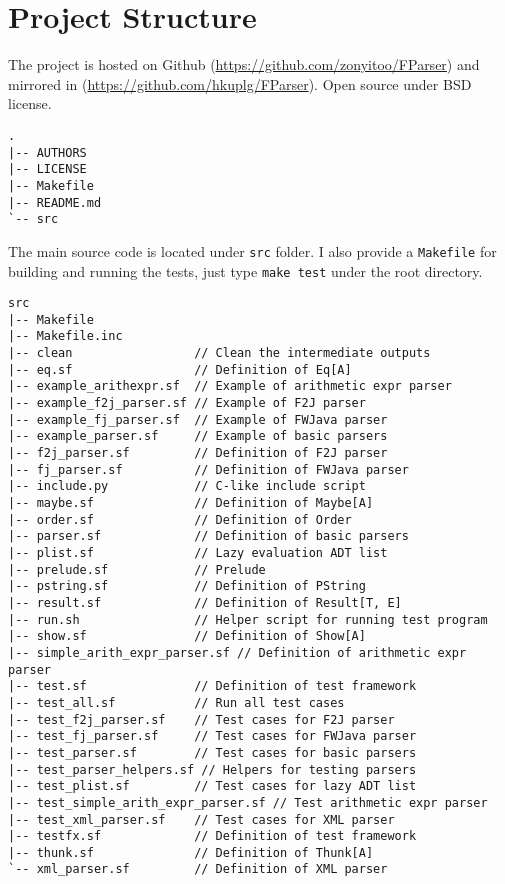 \section{Project Structure}

The project is hosted on Github (\url{https://github.com/zonyitoo/FParser}) and mirrored in (\url{https://github.com/hkuplg/FParser}). Open source under BSD license.

\begin{lstlisting}[language={}]
.
|-- AUTHORS
|-- LICENSE
|-- Makefile
|-- README.md
`-- src
\end{lstlisting}

The main source code is located under \texttt{src} folder. I also provide a \texttt{Makefile} for building and running the tests, just type \texttt{make test} under the root directory.

\begin{lstlisting}[language={}]
src
|-- Makefile
|-- Makefile.inc
|-- clean                 // Clean the intermediate outputs
|-- eq.sf                 // Definition of Eq[A]
|-- example_arithexpr.sf  // Example of arithmetic expr parser
|-- example_f2j_parser.sf // Example of F2J parser
|-- example_fj_parser.sf  // Example of FWJava parser
|-- example_parser.sf     // Example of basic parsers
|-- f2j_parser.sf         // Definition of F2J parser
|-- fj_parser.sf          // Definition of FWJava parser
|-- include.py            // C-like include script
|-- maybe.sf              // Definition of Maybe[A]
|-- order.sf              // Definition of Order
|-- parser.sf             // Definition of basic parsers
|-- plist.sf              // Lazy evaluation ADT list
|-- prelude.sf            // Prelude
|-- pstring.sf            // Definition of PString
|-- result.sf             // Definition of Result[T, E]
|-- run.sh                // Helper script for running test program
|-- show.sf               // Definition of Show[A]
|-- simple_arith_expr_parser.sf // Definition of arithmetic expr parser
|-- test.sf               // Definition of test framework
|-- test_all.sf           // Run all test cases
|-- test_f2j_parser.sf    // Test cases for F2J parser
|-- test_fj_parser.sf     // Test cases for FWJava parser
|-- test_parser.sf        // Test cases for basic parsers
|-- test_parser_helpers.sf // Helpers for testing parsers
|-- test_plist.sf         // Test cases for lazy ADT list
|-- test_simple_arith_expr_parser.sf // Test arithmetic expr parser
|-- test_xml_parser.sf    // Test cases for XML parser
|-- testfx.sf             // Definition of test framework
|-- thunk.sf              // Definition of Thunk[A]
`-- xml_parser.sf         // Definition of XML parser
\end{lstlisting}

